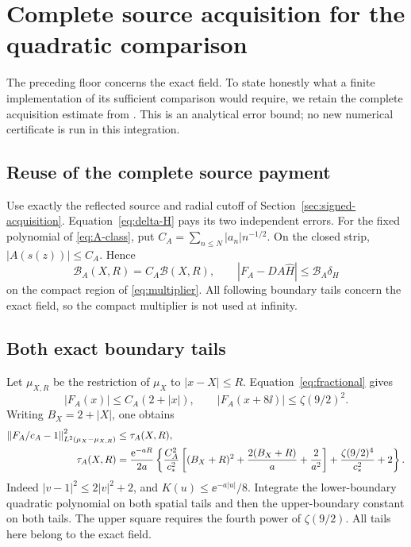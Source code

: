 \section{Complete source acquisition for the quadratic comparison}\label{sec:acquisition}

The preceding floor concerns the exact field. To state honestly what
a finite implementation of its sufficient comparison would require,
we retain the complete acquisition estimate from
\cite{OGMollifier,OGCorrection}. This is an analytical error bound;
no new numerical certificate is run in this integration.

\subsection{Reuse of the complete source payment}

Use exactly the reflected source and radial cutoff of
Section~\ref{sec:signed-acquisition}. Equation~\eqref{eq:delta-H}
pays its two independent errors. For the fixed polynomial of
\eqref{eq:A-class}, put \(C_A=\sum_{n\le N}|a_n|n^{-1/2}\).
On the closed strip, \(|A(s(z))|\le C_A\). Hence
\[
 \mathcal B_A(X,R)=C_A\mathcal B(X,R),\qquad
 |F_A-DA\widehat H|\le\mathcal B_A\delta_H
\]
on the compact region of \eqref{eq:multiplier}. All following boundary
tails concern the exact field, so the compact multiplier is not used
at infinity.

\subsection{Both exact boundary tails}

Let \(\mu_{X,R}\) be the restriction of \(\mu_X\) to \(|x-X|\le R\).
Equation~\eqref{eq:fractional} gives
\[
 |F_A(x)|\le C_A(2+|x|),\qquad
 |F_A(x+8\ii)|\le\zeta(9/2)^2.
\]
Writing \(B_X=2+|X|\), one obtains
\begin{align}\label{eq:quadratic-tail}
 \left\lVert F_A/c_A-1\right\rVert_{L^2(\mu_X-\mu_{X,R})}^2
 &\le\tau_A(X,R),\nonumber\\
 \tau_A(X,R)
 &=\frac{\mathrm e^{-aR}}{2a}\left\{
 \frac{C_A^2}{c_*^2}
 \left[(B_X+R)^2+\frac{2(B_X+R)}a+\frac2{a^2}\right]
 +\frac{\zeta(9/2)^4}{c_*^2}+2\right\}.
\end{align}
Indeed \(|v-1|^2\le2|v|^2+2\), and
\(K(u)\le\ee^{-a|u|}/8\).
Integrate the lower-boundary quadratic polynomial on both spatial
tails and then the upper-boundary constant on both tails.
The upper square requires the fourth power of \(\zeta(9/2)\).
All tails here belong to the exact field.

